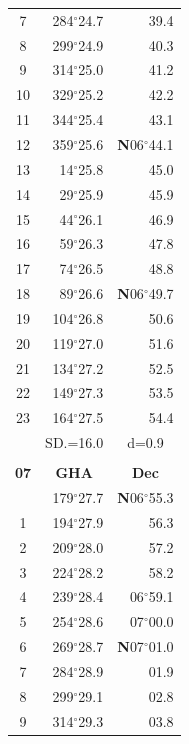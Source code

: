 \documentclass[10pt, a4paper]{report}
\begin{document}
\begin{scriptsize}
\begin{tabular*}{0.2\textwidth}[t]{@{\extracolsep{\fill}}|c|rr|}
7 & 284$^\circ$24.7 & 39.4\\
8 & 299$^\circ$24.9 & 40.3\\
9 & 314$^\circ$25.0 & \raisebox{0.24ex}{\boldmath$\cdot$~\boldmath$\cdot$~~}41.2\\
10 & 329$^\circ$25.2 & 42.2\\
11 & 344$^\circ$25.4 & 43.1\\[2Pt]
12 & 359$^\circ$25.6 & \textbf{N}06$^\circ$44.1\\
13 & 14$^\circ$25.8 & 45.0\\
14 & 29$^\circ$25.9 & 45.9\\
15 & 44$^\circ$26.1 & \raisebox{0.24ex}{\boldmath$\cdot$~\boldmath$\cdot$~~}46.9\\
16 & 59$^\circ$26.3 & 47.8\\
17 & 74$^\circ$26.5 & 48.8\\[2Pt]
18 & 89$^\circ$26.6 & \textbf{N}06$^\circ$49.7\\
19 & 104$^\circ$26.8 & 50.6\\
20 & 119$^\circ$27.0 & 51.6\\
21 & 134$^\circ$27.2 & \raisebox{0.24ex}{\boldmath$\cdot$~\boldmath$\cdot$~~}52.5\\
22 & 149$^\circ$27.3 & 53.5\\
23 & 164$^\circ$27.5 & 54.4\\
\hline
\rule{0pt}{2.4ex} & \multicolumn{1}{c}{SD.=16.0} & \multicolumn{1}{c|}{d=0.9}\\
\hline
\multicolumn{1}{c}{}\\[-0.5ex]\hline
\multicolumn{1}{|c|}{\rule{0pt}{2.6ex}\textbf{07}} & \multicolumn{1}{c}{\textbf{GHA}} & \multicolumn{1}{c|}{\textbf{Dec}}\\
\hline\rule{0pt}{2.6ex}\noindent
0 & 179$^\circ$27.7 & \textbf{N}06$^\circ$55.3\\
1 & 194$^\circ$27.9 & 56.3\\
2 & 209$^\circ$28.0 & 57.2\\
3 & 224$^\circ$28.2 & \raisebox{0.24ex}{\boldmath$\cdot$~\boldmath$\cdot$~~}58.2\\
4 & 239$^\circ$28.4 & 06$^\circ$59.1\\
5 & 254$^\circ$28.6 & 07$^\circ$00.0\\[2Pt]
6 & 269$^\circ$28.7 & \textbf{N}07$^\circ$01.0\\
7 & 284$^\circ$28.9 & 01.9\\
8 & 299$^\circ$29.1 & 02.8\\
9 & 314$^\circ$29.3 & \raisebox{0.24ex}{\boldmath$\cdot$~\boldmath$\cdot$~~}03.8\\

\end{tabular*}
\end{scriptsize}
\end{document}
